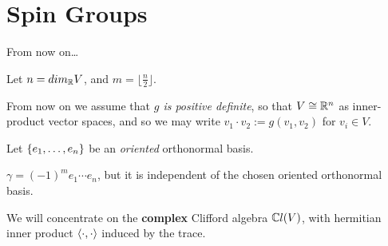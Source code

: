 
\section{Spin Groups}

\begin{frame}{From now on\dots} %

    Let $n = dim_\mathbb R V$, and $m = \lfloor \frac{n}{2} \rfloor$.

    From now on we assume that \emph{$g$ is positive definite}, so that $V \cong \mathbb R^n$ as inner-product vector spaces, and so we may write $v_1 \cdot v_2 := g(v_1, v_2)$ for $v_i \in V$. %
    
    Let $\{e_1, \dots, e_n\}$ be an \emph{oriented} orthonormal basis.
    
    $\gamma = (-1)^m e_1 \cdots e_n$, but it is independent of the chosen oriented orthonormal basis. %

    We will concentrate on the \textbf{complex} Clifford algebra $\mathbb C l(V)$, with hermitian inner product $\langle \cdot , \cdot \rangle$ induced by the trace.%
    
\end{frame}

